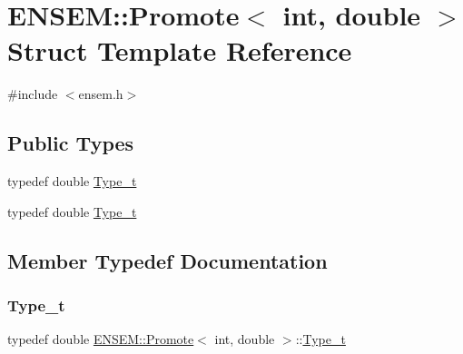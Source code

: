 \hypertarget{structENSEM_1_1Promote_3_01int_00_01double_01_4}{}\section{E\+N\+S\+EM\+:\+:Promote$<$ int, double $>$ Struct Template Reference}
\label{structENSEM_1_1Promote_3_01int_00_01double_01_4}


{\ttfamily \#include $<$ensem.\+h$>$}

\subsection*{Public Types}
\begin{DoxyCompactItemize}
\item 
typedef double \mbox{\hyperlink{structENSEM_1_1Promote_3_01int_00_01double_01_4_a9336b13a291d56af90484918a2f0ebe5}{Type\+\_\+t}}
\item 
typedef double \mbox{\hyperlink{structENSEM_1_1Promote_3_01int_00_01double_01_4_a9336b13a291d56af90484918a2f0ebe5}{Type\+\_\+t}}
\end{DoxyCompactItemize}


\subsection{Member Typedef Documentation}
\mbox{\label{structENSEM_1_1Promote_3_01int_00_01double_01_4_a9336b13a291d56af90484918a2f0ebe5}} 
\subsubsection{\texorpdfstring{Type\_t}{Type\_t}\hspace{0.1cm}{\footnotesize\ttfamily [1/2]}}
{\footnotesize\ttfamily typedef double \mbox{\hyperlink{structENSEM_1_1Promote}{E\+N\+S\+E\+M\+::\+Promote}}$<$ int, double $>$\+::\mbox{\hyperlink{structENSEM_1_1Promote_3_01int_00_01double_01_4_a9336b13a291d56af90484918a2f0ebe5}{Type\+\_\+t}}}

\mbox{\label{structENSEM_1_1Promote_3_01int_00_01double_01_4_a9336b13a291d56af90484918a2f0ebe5}} 
